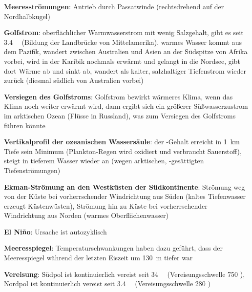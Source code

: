 \textbf{Meeresströmungen}:
Antrieb durch Passatwinde (rechtsdrehend auf der Nordhalbkugel)

\textbf{Golfstrom}:
oberflächlicher Warmwasserstrom mit wenig Salzgehalt,
gibt es seit \SI{3.4}{\mega\year}
(Bildung der Landbrücke von Mittelamerika),
warmes Wasser kommt aus dem Pazifik,
wandert zwischen Australien und Asien an der Südspitze von Afrika vorbei,
wird in der Karibik nochmals erwärmt und gelangt in die Nordsee,
gibt dort Wärme ab und sinkt ab,
wandert als kalter, salzhaltiger Tiefenstrom wieder zurück
(diesmal südlich von Australien vorbei)

\textbf{Versiegen des Golfstroms}:
Golfstrom bewirkt wärmeres Klima,
wenn das Klima noch weiter erwärmt wird,
dann ergibt sich ein größerer Süßwasserzustrom im arktischen Ozean (Flüsse in Russland),
was zum Versiegen des Golfstroms führen könnte

\textbf{Vertikalprofil der ozeanischen Wassersäule}:
der -Gehalt erreicht in \SI{1}{\kilo\meter} Tiefe sein Minimum
(Plankton-Regen wird oxidiert und verbraucht Sauerstoff),
steigt in tieferem Wasser wieder an
(wegen arktischen, -gesättigten Tiefenströmungen)

\textbf{Ekman-Strömung an den Westküsten der Südkontinente}:
Strömung weg von der Küste bei vorherrschender Windrichtung aus Süden
(kaltes Tiefenwasser erzeugt Küstenwüsten),
Strömung hin zu Küste bei vorherrschender Windrichtung aus Norden
(warmes Oberflächenwasser)

\textbf{El Niño}:
Ursache ist autozyklisch

\textbf{Meeresspiegel}:
Temperaturschwankungen haben dazu geführt, dass der Meeresspiegel während der letzten Eiszeit
um \SI{130}{\meter} tiefer war

\textbf{Vereisung}:
Südpol ist kontinuierlich vereist seit \SI{34}{\mega\year}
(Vereisungsschwelle \SI{750}{\ppm} ),
Nordpol ist kontinuierlich vereist seit \SI{3.4}{\mega\year}
(Vereisungsschwelle \SI{280}{\ppm} )

